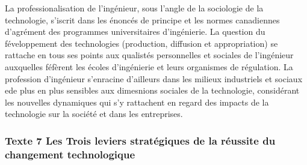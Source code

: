 \documentclass[11pt]{article}
\begin{document}
La professionalisation de l'ingénieur, sous l'angle de la sociologie de la
technologie, s'iscrit dans les énoncés de principe et les normes canadiennes
d'agrément des programmes universitaires d'ingénierie. La question du
féveloppement des technologies (production, diffusion et appropriation) se
rattache en tous ses points aux qualistés personnelles et sociales de
l'ingénieur auxquelles féfèrent les écoles d'ingénierie et leurs organismes de
régulation. La profession d'ingénieur s'enracine d'ailleurs dans les milieux
industriels et sociaux ede plus en plus sensibles aux dimesnions sociales de la
technologie, considérant les nouvelles dynamiques qui s'y rattachent en regard
des impacts de la technologie sur la société et dans les entreprises.

\subsubsection{Texte 7 Les \textbf{Trois leviers stratégiques} de la réussite du changement technologique}
\label{sec:org09f9966}
\end{document}
